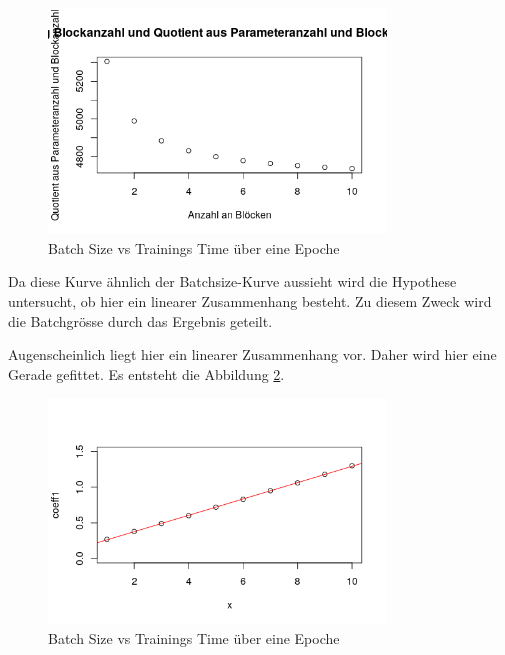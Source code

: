 \begin{figure}[h]
 \centering
 \includegraphics[width=0.8\textwidth]{KapitelPartB/Images/quotient.png}
 \caption{Batch Size vs Trainings Time über eine Epoche}
 \label{fig:quotient}
\end{figure}


Da diese Kurve ähnlich der Batchsize-Kurve aussieht wird die Hypothese untersucht, ob hier ein linearer Zusammenhang besteht. Zu diesem Zweck wird die Batchgrösse durch das Ergebnis geteilt.

Augenscheinlich liegt hier ein linearer Zusammenhang vor. Daher wird hier eine Gerade gefittet.
Es entsteht die Abbildung \ref{fig:gerade}.

\begin{figure}[h]
 \centering
 \includegraphics[width=0.8\textwidth]{KapitelPartB/Images/gerade.png}
 \caption{Batch Size vs Trainings Time über eine Epoche}
 \label{fig:gerade}
\end{figure}




